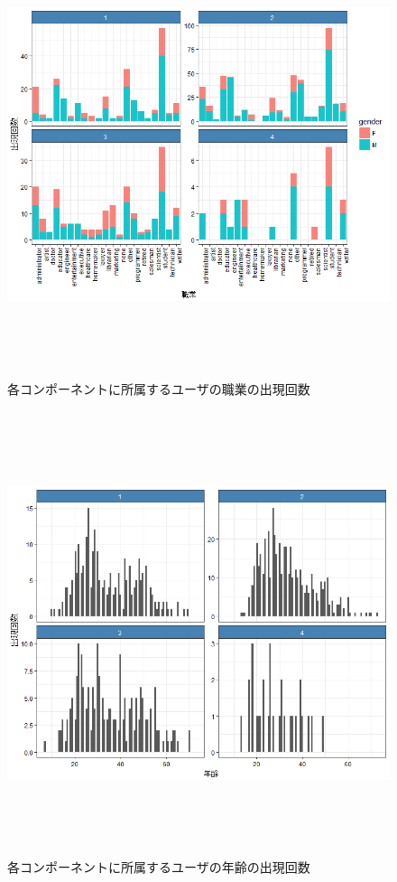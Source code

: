 \documentclass[a4j,12pt]{jarticle}
\begin{document}
\begin{figure}[tbp]
\begin{center}
\includegraphics[clip,height= 130mm]{data/job_count.png}
\end{center}
\caption{各コンポーネントに所属するユーザの職業の出現回数}
\label{job_count}
\end{figure}

\begin{figure}[tbp]
\begin{center}
\includegraphics[clip,height= 130mm]{data/age_count.png}
\end{center}
\caption{各コンポーネントに所属するユーザの年齢の出現回数}
\label{age_count}
\end{figure}
\end{document}
